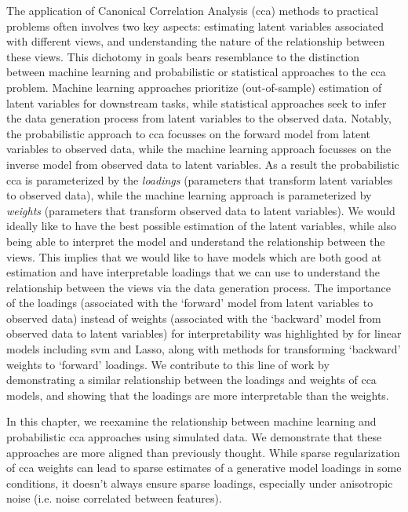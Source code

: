 The application of Canonical Correlation Analysis (\acrshort{cca}) methods to practical problems often involves two key aspects: estimating latent variables associated with different views, and understanding the nature of the relationship between these views.
This dichotomy in goals bears resemblance to the distinction between machine learning and probabilistic or statistical approaches to the \acrshort{cca} problem.
Machine learning approaches prioritize (out-of-sample) estimation of latent variables for downstream tasks, while statistical approaches seek to infer the data generation process from latent variables to the observed data.
Notably, the probabilistic approach to \acrshort{cca} focusses on the forward model from latent variables to observed data, while the machine learning approach focusses on the inverse model from observed data to latent variables.
As a result the probabilistic \acrshort{cca} is parameterized by the \textit{loadings} (parameters that transform latent variables to observed data), while the machine learning approach is parameterized by \textit{weights} (parameters that transform observed data to latent variables).
We would ideally like to have the best possible estimation of the latent variables, while also being able to interpret the model and understand the relationship between the views.
This implies that we would like to have models which are both good at estimation and have interpretable \gls{loadings} that we can use to understand the relationship between the views via the data generation process.
The importance of the \gls{loadings} (associated with the `forward' model from latent variables to observed data) instead of weights (associated with the `backward' model from observed data to latent variables) for interpretability was highlighted by \cite{haufe2014interpretation} for linear models including \acrshort{svm} and Lasso, along with methods for transforming `backward' weights to `forward' loadings.
We contribute to this line of work by demonstrating a similar relationship between the \gls{loadings} and weights of \acrshort{cca} models, and showing that the \gls{loadings} are more interpretable than the weights.

In this chapter, we reexamine the relationship between machine learning and probabilistic \acrshort{cca} approaches using simulated data.
We demonstrate that these approaches are more aligned than previously thought.
While sparse regularization of \acrshort{cca} weights can lead to sparse estimates of a generative model \gls{loadings} in some conditions, it doesn't always ensure sparse loadings, especially under anisotropic noise (i.e. noise correlated between features).
\newpage

